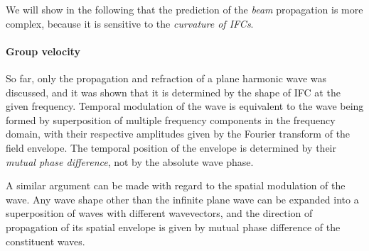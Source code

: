We will show in the following that the prediction of the \textit{beam} propagation is more complex, because it is sensitive to the \textit{curvature of IFCs}. 

\paragraph{Group velocity}  %
So far, only the propagation and refraction of a plane harmonic wave was discussed, and it was shown that it is determined by the shape of IFC at the given frequency.
Temporal modulation of the wave 
is equivalent to the wave being formed by superposition of multiple frequency components in the frequency domain, with their respective amplitudes given by the Fourier transform of the field envelope. The temporal position of the envelope is determined by their \textit{mutual phase difference}, not by the absolute wave phase. 

A similar argument can be made with regard to the spatial modulation of the wave. Any wave shape other than the infinite plane wave can be expanded into a superposition of waves with different wavevectors, and the direction of propagation of its spatial envelope is given by mutual phase difference of the constituent waves. %

